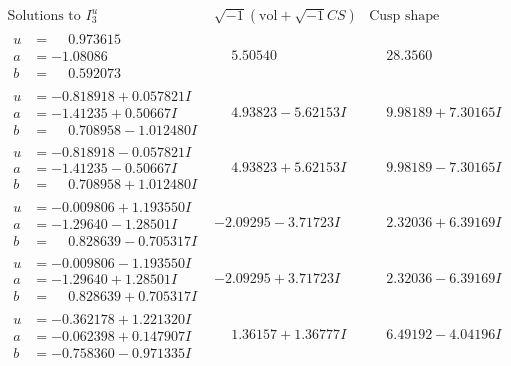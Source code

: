 \documentclass[1p]{elsarticle_modified}
\theoremstyle{definition}
\newcommand{\I}{\sqrt{-1}}
\begin{document}
$$\begin{array}{c|c|c}  
\text{Solutions to }I^u_{3}& \I (\text{vol} + \sqrt{-1}CS) & \text{Cusp shape}\\
 \hline 
\begin{aligned}
u &= \phantom{-}0.973615\phantom{ +0.000000I} \\
a &= -1.08086\phantom{ +0.000000I} \\
b &= \phantom{-}0.592073\phantom{ +0.000000I}\end{aligned}
 & \phantom{-}5.50540\phantom{ +0.000000I} & \phantom{-}28.3560\phantom{ +0.000000I} \\ \hline\begin{aligned}
u &= -0.818918 + 0.057821 I \\
a &= -1.41235 + 0.50667 I \\
b &= \phantom{-}0.708958 - 1.012480 I\end{aligned}
 & \phantom{-}4.93823 - 5.62153 I & \phantom{-}9.98189 + 7.30165 I \\ \hline\begin{aligned}
u &= -0.818918 - 0.057821 I \\
a &= -1.41235 - 0.50667 I \\
b &= \phantom{-}0.708958 + 1.012480 I\end{aligned}
 & \phantom{-}4.93823 + 5.62153 I & \phantom{-}9.98189 - 7.30165 I \\ \hline\begin{aligned}
u &= -0.009806 + 1.193550 I \\
a &= -1.29640 - 1.28501 I \\
b &= \phantom{-}0.828639 - 0.705317 I\end{aligned}
 & -2.09295 - 3.71723 I & \phantom{-}2.32036 + 6.39169 I \\ \hline\begin{aligned}
u &= -0.009806 - 1.193550 I \\
a &= -1.29640 + 1.28501 I \\
b &= \phantom{-}0.828639 + 0.705317 I\end{aligned}
 & -2.09295 + 3.71723 I & \phantom{-}2.32036 - 6.39169 I \\ \hline\begin{aligned}
u &= -0.362178 + 1.221320 I \\
a &= -0.062398 + 0.147907 I \\
b &= -0.758360 - 0.971335 I\end{aligned}
 & \phantom{-}1.36157 + 1.36777 I & \phantom{-}6.49192 - 4.04196 I \\ \hline\begin{aligned}

\end{aligned}
\end{array}$$
\end{document}
